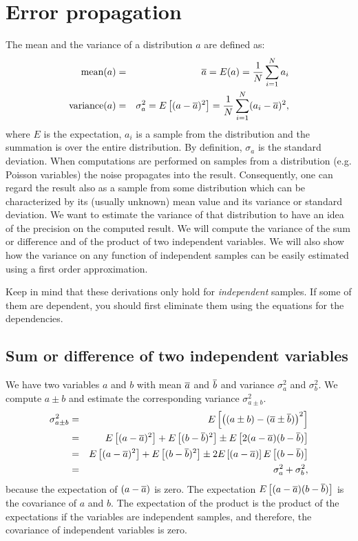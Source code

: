 \newpage
\section{Error propagation \label{app:error}}
The mean and the variance of a distribution $a$ are defined as:
\begin{eqnarray}
  \mbox{mean}(a) & = & \overline{a} = E(a) = \frac{1}{N} \sum_{i=1}^N a_i\\
  \mbox{variance}(a) & = & \sigma_a^2 = E\left[ (a - \overline{a})^2 \right]
   = \frac{1}{N} \sum_{i=1}^N (a_i - \overline{a})^2,
\end{eqnarray}
where $E$ is the expectation, $a_i$ is a sample from the distribution and the
summation is over the entire distribution. By definition, $\sigma_a$ is the
standard deviation. When computations are performed on samples from a
distribution (e.g. Poisson variables) the noise propagates into the
result. Consequently, one can regard the result also as a sample from some
distribution which can be characterized by its (usually unknown) mean value
and its variance or standard deviation. We want to estimate the variance of
that distribution to have an idea of the precision on the computed result. We
will compute the variance of the sum or difference and of the product of two
independent variables. We will also show how the variance on any function of
independent samples can be easily estimated using a first order approximation.

Keep in mind that these derivations only hold for {\em independent}
samples. If some of them are dependent, you should first eliminate them using
the equations for the dependencies.

\subsection{Sum or difference of two independent variables}
We have two variables $a$ and $b$ with mean $\overline{a}$ and $\overline{b}$
and variance $\sigma_a^2$ and $\sigma_b^2$. We compute $a \pm b$ and estimate
the corresponding variance $\sigma_{a \pm b}^2$.
\begin{eqnarray}
\sigma_{a \pm b}^2 & = & E\left[{\left((a \pm b) - (\overline{a} \pm \overline{b}) \right)^2}\right]
           \nonumber\\
 & = & E\left[{(a-\overline{a})^2}\right] + E\left[{(b-\overline{b})^2}\right] \pm E\left[{2(a-\overline{a})(b-\overline{b})}\right]
           \nonumber\\
 & = & E\left[{(a-\overline{a})^2}\right] + E\left[{(b-\overline{b})^2}\right] \pm 2 E\left[{(a-\overline{a})}\right]E\left[{(b-\overline{b})}\right]
           \nonumber\\
 & = & \sigma_a^2 + \sigma_b^2, \label{eq:app_sumerror}
\end{eqnarray}
because the expectation of $(a - \overline{a})$ is zero. The expectation
$E\left[{(a-\overline{a})(b-\overline{b})}\right]$ is the covariance of $a$ and $b$. The
expectation of the product is the product of the expectations if the
variables are independent samples, and therefore, the covariance of
independent variables is zero.

